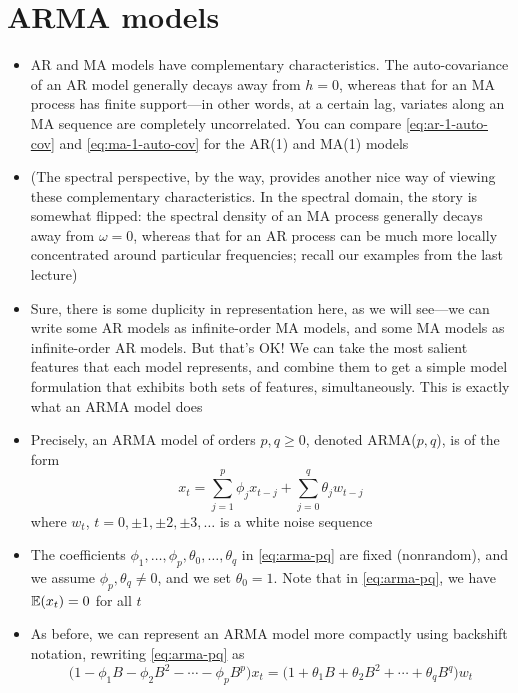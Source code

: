 \documentclass{article}
\begin{document}
\section{ARMA models}

\begin{itemize}
\item AR and MA models have complementary characteristics. The auto-covariance
  of an AR model generally decays away from $h=0$, whereas that for an MA
  process has finite support---in other words, at a certain lag, variates along
  an MA sequence are completely uncorrelated. You can compare
  \eqref{eq:ar-1-auto-cov} and \eqref{eq:ma-1-auto-cov} for the AR(1) and MA(1)
  models

\item (The spectral perspective, by the way, provides another nice way of
  viewing these complementary characteristics. In the spectral domain, the story
  is somewhat flipped: the spectral density of an MA process generally decays
  away from $\omega=0$, whereas that for an AR process can be much more locally
  concentrated around particular frequencies; recall our examples from the last
  lecture) 

\item Sure, there is some duplicity in representation here, as we will see---we
  can write some AR models as infinite-order MA models, and some MA models as  
  infinite-order AR models. But that's OK! We can take the most salient features
  that each model represents, and combine them to get a simple model formulation
  that exhibits both sets of features, simultaneously. This is exactly what an
  ARMA model does       

\item Precisely, an ARMA model of orders $p,q \geq 0$, denoted ARMA($p,q$), is
  of the form 
  \begin{equation}
  \label{eq:arma-pq}
  x_t = \sum_{j=1}^p \phi_j x_{t-j} + \sum_{j=0}^q \theta_j w_{t-j}  
  \end{equation}
  where $w_t$, $t = 0, \pm 1, \pm 2, \pm 3, \dots$ is a white noise sequence 

\item The coefficients $\phi_1,\dots,\phi_p,\theta_0,\dots,\theta_q$ in
  \eqref{eq:arma-pq} are fixed (nonrandom), and we assume $\phi_p,\theta_q \not=
  0$, and we set $\theta_0 = 1$. Note that in \eqref{eq:arma-pq}, we have
  $\mathbb{E}(x_t) = 0$ for all $t$ 

\item As before, we can represent an ARMA model more compactly using backshift 
  notation, rewriting \eqref{eq:arma-pq} as
  \begin{equation}
  \label{eq:arma-pq-backshift}
  \Big(1 - \phi_1 B - \phi_2 B^2 - \cdots - \phi_p B^p \Big) x_t = 
  \Big(1 + \theta_1 B + \theta_2 B^2 + \cdots + \theta_q B^q \Big) w_t   
  \end{equation}


\end{itemize}
\end{document}
